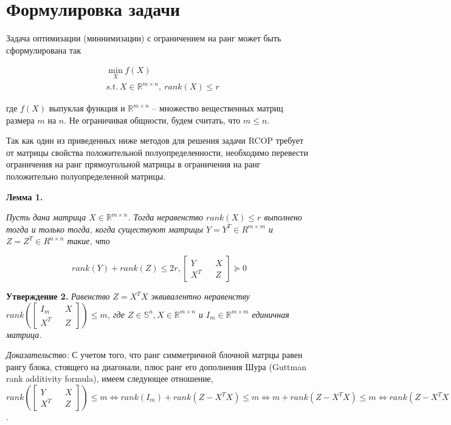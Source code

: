 \documentclass[oneside,final,14pt]{extreport} %
\begin{document}
\section{Формулировка задачи}

Задача оптимизации (миннимизации) с ограничением на ранг может быть сформулирована так

\begin{equation}
	\label{new:PF}
	\begin{aligned}
		&\min_X f(X) \\ &s.t. \ X \in \mathbb{R}^{m \times n}, \ rank(X) \le r
	\end{aligned}
\end{equation}

где $f(X)$ выпуклая функция и $\mathbb R^{m \times n}$ -- множество вещественных матриц размера $m$ на $n$. Не ограничивая общности, будем считать, что  $m \le n$. 

Так как один из приведенных ниже методов для решения задачи RCOP требует от матрицы свойства положительной полуопределенности, необходимо перевести ограничения на ранг прямоугольной матрицы в ограничения на ранг положительно полуопределенной матрицы.


\textbf{Лемма 1.} 
{\it Пусть дана матрица $X \in \mathbb R^{m \times n}$. Тогда неравенство $rank(X) \le r$ выполнено тогда и только тогда, когда существуют матрицы $Y =Y^T \in R^{m \times m}$ и $Z=Z^T \in R^{n \times n}$ такие, что

\begin{equation}
 rank(Y) + rank(Z) \le 2r, \begin{bmatrix} Y && X \\ X^T && Z \end{bmatrix} \succeq 0  
\end{equation}
}

\textbf{Утверждение 2.}
{\it Равенство $Z = X^T X$ эквивалентно неравенству $rank\left( \begin{bmatrix} I_m && X \\ X^T && Z \end{bmatrix} \right) \le m$, где $Z \in \mathbb S^n, X \in \mathbb R^{m \times n}$ и $I_m \in \mathbb R^{m \times m}$ единичная матрица.}

\textit{Доказательство:} С учетом того, что ранг симметричной блочной матрцы равен рангу блока, стоящего на диагонали, плюс ранг его дополнения Шура (Guttman rank additivity formula), имеем следующее отношение, $rank\left( \begin{bmatrix} Y && X \\ X^T && Z \end{bmatrix} \right) \le m \Leftrightarrow rank(I_m) + rank(Z - X^TX) \le m \Leftrightarrow m + rank(Z-X^TX) \le m \Leftrightarrow rank (Z - X^TX) = 0 \Leftrightarrow Z = X^TX$.
\end{document}
